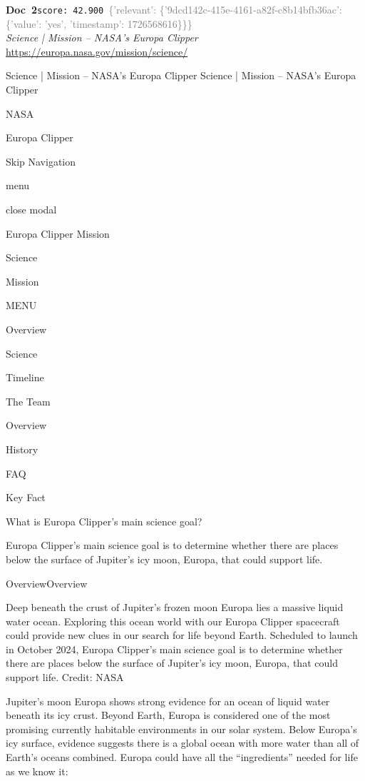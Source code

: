 \documentclass[a4paper,11pt]{article}
\begin{document}
\begin{docenv}
{\footnotesize\textcolor{doccolor}{\textbf{Doc~2}}}\hfill{\tiny\texttt{score:~42.900}}\ {\tiny\textcolor{gray}{\{'relevant': \{'9dcd142c-415e-4161-a82f-c8b14bfb36ac': \{'value': 'yes', 'timestamp': 1726568616\}\}\}}}\\[3pt]
{\small\textit{Science | Mission – NASA's Europa Clipper}}\\[2pt]
{\tiny\url{https://europa.nasa.gov/mission/science/}}\\[4pt]
{\footnotesize Science | Mission – NASA's Europa Clipper
Science | Mission – NASA's Europa Clipper

NASA

Europa Clipper

Skip Navigation

menu

close modal

Europa Clipper Mission

Science

Mission

MENU

Overview

Science

Timeline

The Team

Overview

History

FAQ

Key Fact

What is Europa Clipper's main science goal? 

Europa Clipper’s main science goal is to determine whether there are places below the surface of Jupiter’s icy moon, Europa, that could support life.

OverviewOverview

Deep beneath the crust of Jupiter’s frozen moon Europa lies a massive liquid water ocean. Exploring this ocean world with our Europa Clipper spacecraft could provide new clues in our search for life beyond Earth. Scheduled to launch in October 2024, Europa Clipper’s main science goal is to determine whether there are places below the surface of Jupiter’s icy moon, Europa, that could support life. Credit: NASA

Jupiter’s moon Europa shows strong evidence for an ocean of liquid water beneath its icy crust. Beyond Earth, Europa is considered one of the most promising currently habitable environments in our solar system. 
Below Europa’s icy surface, evidence suggests there is a global ocean with more water than all of Earth’s oceans combined. Europa could have all the “ingredients” needed for life as we know it: 

}
\end{docenv}
\end{document}
